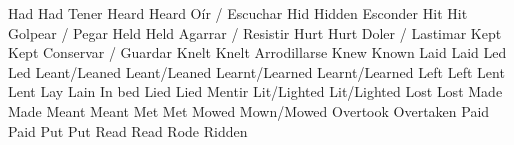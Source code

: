 	            {Had}{}	                {Had}{}                 {Tener}{}
	            {Heard}{}	            {Heard}{}               {Oír / Escuchar}{}
	            {Hid}{}	                {Hidden}{}              {Esconder}{}
	            {Hit}{}	                {Hit}{}                 {Golpear / Pegar}{}
	            {Held}{}	            {Held}{}                {Agarrar / Resistir}{}
	            {Hurt}{}	            {Hurt}{}                {Doler / Lastimar}{}
	            {Kept}{}	            {Kept}{}                {Conservar / Guardar}{}
	            {Knelt}{}	            {Knelt}{}               {Arrodillarse}{}
	            {Knew}{}	            {Known}{}               {}{}
	            {Laid}{}	            {Laid}{}                {}{}
	            {Led}{}	                {Led}{}                 {}{}
	            {Leant/Leaned}{}	    {Leant/Leaned}{}        {}{}
	            {Learnt/Learned}{}	    {Learnt/Learned}{}      {}{}
	            {Left}{}	            {Left}{}                {}{}
	            {Lent}{}	            {Lent}{}                {}{}
	            {Lay}{}	                {Lain}{}                {In bed}{}
	            {Lied}{}	            {Lied}{}                {Mentir}{}
	            {Lit/Lighted}{}	        {Lit/Lighted}{}         {}{}
	            {Lost}{}	            {Lost}{}                {}{}
	            {Made}{}	            {Made}{}                {}{}
	            {Meant}{}	            {Meant}{}               {}{}
	            {Met}{}	                {Met}{}                 {}{}
	            {Mowed}{}	            {Mown/Mowed}{}          {}{}
	        {Overtook}{}	        {Overtaken}{}           {}{}
	            {Paid}{}	            {Paid}{}                {}{}
	            {Put}{}	                {Put}{}                 {}{}
	            {Read}{}	            {Read}{}                {}{}
	            {Rode}{}	            {Ridden}{}              {}{}
